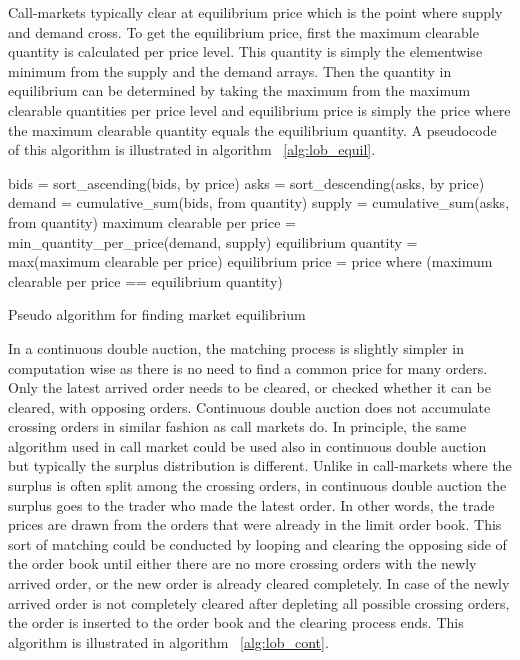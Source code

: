 Call-markets typically clear at equilibrium price which is the point where
supply and demand cross. 
To get the equilibrium price, first the maximum clearable quantity
is calculated per price level. This quantity is simply the elementwise
minimum from the supply and the demand arrays. Then the quantity in equilibrium
can be determined by taking the maximum from the maximum clearable quantities
per price level and equilibrium price is simply the price where the maximum clearable quantity
equals the equilibrium quantity. A pseudocode of this algorithm is illustrated in 
algorithm ~\ref{alg:lob_equil}.

\begin{algorithm}[H]
    \SetAlgoLined
    \DontPrintSemicolon
    
    bids = sort\_ascending(bids, by price)\;
    asks = sort\_descending(asks, by price)\;
    \;
    demand = cumulative\_sum(bids, from quantity)\;
    supply = cumulative\_sum(asks, from quantity)\;
    \;
    maximum clearable per price = min\_quantity\_per\_price(demand, supply)\;
    \;
    equilibrium quantity = max(maximum clearable per price)\;
    equilibrium price = price where (maximum clearable per price == equilibrium quantity)\;
    \caption{Pseudo algorithm for finding market equilibrium}
    \label{alg:lob_equil}
\end{algorithm}

In a continuous double auction, the matching process is slightly simpler in computation
wise as there is no need to find a common price for many orders. Only the latest arrived
order needs to be cleared, or checked whether it can be cleared, with opposing orders. Continuous
double auction does not accumulate crossing orders in similar fashion as call markets do. 
In principle, the same algorithm used in call market could be used also in continuous double auction 
but typically the surplus distribution is different. Unlike in call-markets where the surplus is often
split among the crossing orders, in continuous double auction the surplus goes to the trader who made the 
latest order. In other words, the trade prices are drawn from the orders that were already in the limit 
order book. This sort of matching could be conducted by looping and clearing the opposing side of the 
order book until either there are no more crossing orders with the newly arrived order, or the new 
order is already cleared completely. In case of the newly arrived order is not completely cleared after 
depleting all possible crossing orders, the order is inserted to the order book and the clearing process 
ends. This algorithm is illustrated in algorithm ~\ref{alg:lob_cont}. 

